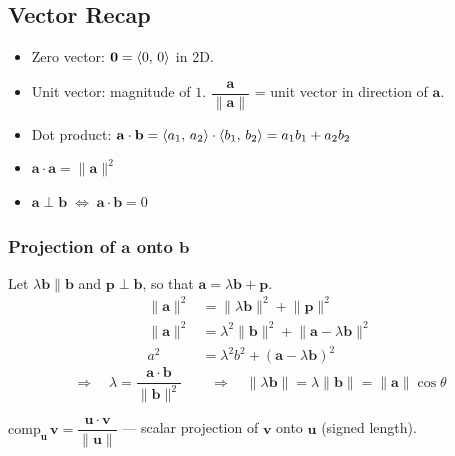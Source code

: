\subsection{Vector Recap}

\begin{itemize}
  \item Zero vector: $\mathbf{0} = \langle 0,\,0 \rangle$ in 2D.
  \item Unit vector: magnitude of $1$. \;
        $\dfrac{\mathbf{a}}{\lVert\mathbf{a}\rVert}$ = unit vector in direction of $\mathbf{a}$.
  \item Dot product:
        $\mathbf{a}\cdot\mathbf{b}
          = \langle a_{1},\,a_{2} \rangle\cdot\langle b_{1},\,b_{2} \rangle
          = a_{1}b_{1}+a_{2}b_{2}$
  \item $\mathbf{a}\cdot\mathbf{a} = \lVert\mathbf{a}\rVert^{2}$
  \item $\mathbf{a}\perp\mathbf{b} \;\Longleftrightarrow\; \mathbf{a}\cdot\mathbf{b} = 0$
\end{itemize}

\subsubsection{Projection of $\mathbf{a}$ onto $\mathbf{b}$}

\begin{center}
\end{center}

Let $\lambda\mathbf{b} \parallel \mathbf{b}$ and $\mathbf{p}\perp\mathbf{b}$, so that $\mathbf{a} = \lambda\mathbf{b} + \mathbf{p}$.
\begin{align*}
  \lVert\mathbf{a}\rVert^{2}
        & = \lVert\lambda\mathbf{b}\rVert^{2} + \lVert\mathbf{p}\rVert^{2} \\
  \lVert\mathbf{a}\rVert^{2}
        & = \lambda^{2}\lVert\mathbf{b}\rVert^{2}
  + \lVert\mathbf{a}-\lambda\mathbf{b}\rVert^{2}                           \\
  a^{2} & = \lambda^{2}b^{2} + (\mathbf{a}-\lambda\mathbf{b})^{2}
\end{align*}
\[
  \Longrightarrow\quad
  \lambda = \frac{\mathbf{a}\cdot\mathbf{b}}{\lVert\mathbf{b}\rVert^{2}}
  \qquad\Longrightarrow\quad
  \lVert\lambda\mathbf{b}\rVert
  = \lambda\lVert\mathbf{b}\rVert
  = \lVert\mathbf{a}\rVert\cos\theta
\]

$\text{comp}_{\mathbf{u}}\,\mathbf{v}
  = \dfrac{\mathbf{u}\cdot\mathbf{v}}{\lVert\mathbf{u}\rVert}$
\; --- scalar projection of $\mathbf{v}$ onto $\mathbf{u}$ (signed length).
